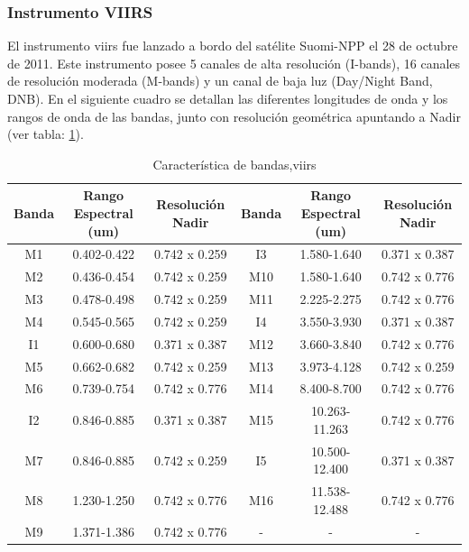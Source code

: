 \subsubsection{Instrumento VIIRS}\label{sub:viirs}
El instrumento \ac{viirs} fue lanzado a bordo del satélite Suomi-NPP el 28 de octubre de 2011. Este instrumento posee 5 canales de alta resolución (I-bands), 16 canales de resolución moderada (M-bands) y un canal de baja luz (Day/Night Band, DNB).  En el siguiente cuadro se detallan las diferentes longitudes de onda y los rangos de onda de las bandas, junto con resolución geométrica apuntando a Nadir (ver tabla: \ref{tab:viirs}).
\begin{table}[H]
\begin{center}
\begin{tabular}{|c|c|c||c|c|c|}
\hline \textbf{Banda} & Rango Espectral (um) & Resolución Nadir & \textbf{Banda} & Rango Espectral (um) & Resolución Nadir \\\hline 
 		M1  & 0.402-0.422   & 0.742 x 0.259 & I3  & 1.580-1.640   & 0.371 x 0.387 \\ \hline 
		M2  & 0.436-0.454   & 0.742 x 0.259 & M10 & 1.580-1.640   & 0.742 x 0.776 \\ \hline 
		M3  & 0.478-0.498   & 0.742 x 0.259 & M11 & 2.225-2.275   & 0.742 x 0.776 \\ \hline 
		M4  & 0.545-0.565   & 0.742 x 0.259 & I4  & 3.550-3.930   & 0.371 x 0.387 \\ \hline 
		I1  & 0.600-0.680   & 0.371 x 0.387 & M12 & 3.660-3.840   & 0.742 x 0.776 \\ \hline 
		M5  & 0.662-0.682   & 0.742 x 0.259 & M13 & 3.973-4.128   & 0.742 x 0.259 \\ \hline 
		M6  & 0.739-0.754   & 0.742 x 0.776 & M14 & 8.400-8.700   & 0.742 x 0.776 \\ \hline 
		I2  & 0.846-0.885   & 0.371 x 0.387 & M15 & 10.263-11.263 & 0.742 x 0.776 \\ \hline 
		M7  & 0.846-0.885   & 0.742 x 0.259 & I5  & 10.500-12.400 & 0.371 x 0.387 \\ \hline 
		M8  & 1.230-1.250   & 0.742 x 0.776 & M16 & 11.538-12.488 & 0.742 x 0.776 \\ \hline 
		M9  & 1.371-1.386   & 0.742 x 0.776 & - &-&- \\ \hline 
\end{tabular}
\end{center}\caption{Característica de bandas,\ac{viirs} \label{tab:viirs}}
\end{table}

